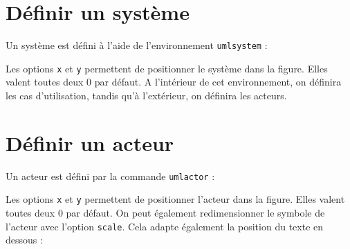 \documentclass[a4paper,11pt]{report}
\newcommand{\inputTikZ}[1]{%
  }%
\newcommand{\inputTikZ}[1]{%
    \texttt{[image: fig/\#1.pdf]}%
  }%
\begin{document}
\section{Définir un système}\label{s.system}

Un système est défini à l'aide de l'environnement {\tt umlsystem} :

\medskip

\begin{minipage}{0.6\textwidth}

\end{minipage}
\begin{minipage}{0.4\textwidth}
\begin{center}
\inputTikZ{system}
\end{center}
\end{minipage}

\medskip

Les options {\tt x} et {\tt y} permettent de positionner le système dans la figure. Elles valent toutes deux 0 par défaut. A l'intérieur de cet environnement, on définira les cas d'utilisation, tandis qu'à l'extérieur, on définira les acteurs.

\section{Définir un acteur}\label{s.actor}

Un acteur est défini par la commande {\tt umlactor} :

\medskip

\begin{minipage}{0.6\textwidth}

\end{minipage}
\begin{minipage}{0.4\textwidth}
\begin{center}
\inputTikZ{actor}
\end{center}
\end{minipage}

\medskip

Les options {\tt x} et {\tt y} permettent de positionner l'acteur dans la figure. Elles valent toutes deux 0 par défaut. On peut également redimensionner le symbole de l'acteur avec l'option {\tt scale}. Cela adapte également la position du texte en dessous :

\medskip

\begin{minipage}{0.5\textwidth}

\end{minipage}
\begin{minipage}{0.5\textwidth}
\begin{center}
\inputTikZ{actorscale}
\end{center}
\end{minipage}
\end{document}
